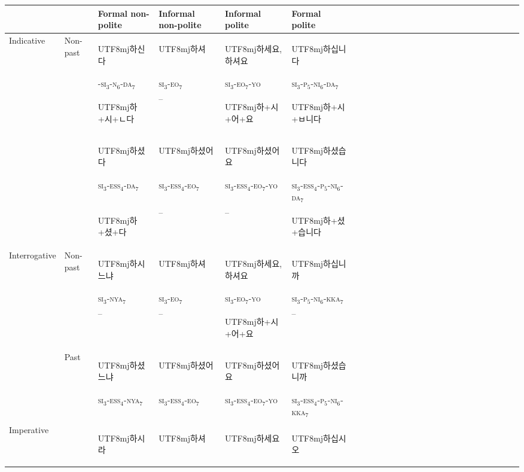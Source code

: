 \documentclass[11pt,letterpaper]{article}
\newcommand{\korean}[1]{\begin{CJK}{UTF8}{mj}#1\end{CJK}}
\begin{document}
\begin{table}[]
    \centering
    \begin{tabular}{llllllllllllllllllllllllll}
           &          &Formal non-polite & Informal non-polite & Informal polite & Formal polite \\ \hline \hline
\multirow{2}{*}{Indicative} & Non-past & \korean{하신다} & \korean{하셔} & \korean{하세요, 하셔요} & \korean{하십니다} \\
                           && -\textsc{si}$_3$-\textsc{n}$_6$-\textsc{da}$_7$ & \textsc{si}$_3$-\textsc{eo}$_7$ & \textsc{si}$_3$-\textsc{eo}$_7$-\textsc{yo} & \textsc{si}$_3$-\textsc{p}$_5$-\textsc{ni}$_6$-\textsc{da}$_7$ \\
&& \korean{하+시+ㄴ다}       &   --   &    \korean{하+시+어+요}             &  \korean{하+시+ㅂ니다}        \\
\hline
&& \korean{하셨다} & \korean{하셨어} & \korean{하셨어요} & \korean{하셨습니다} \\
&& \textsc{si}$_3$-\textsc{ess}$_4$-\textsc{da}$_7$ & \textsc{si}$_3$-\textsc{ess}$_4$-\textsc{eo}$_7$ & \textsc{si}$_3$-\textsc{ess}$_4$-\textsc{eo}$_7$-\textsc{yo} & \textsc{si}$_3$-\textsc{ess}$_4$-\textsc{p}$_5$-\textsc{ni}$_6$-\textsc{da}$_7$ \\
& & \korean{하+셨+다}       &  --    &        --        &  \korean{하+셨+습니다}       \\
\hline
\multirow{2}{*}{Interrogative} & Non-past & \korean{하시느냐} & \korean{하셔} & \korean{하세요, 하셔요} & \korean{하십니까} \\
&& \textsc{si}$_3$-\textsc{nya}$_7$ & \textsc{si}$_3$-\textsc{eo}$_7$ & \textsc{si}$_3$-\textsc{eo}$_7$-\textsc{yo} & \textsc{si}$_3$-\textsc{p}$_5$-\textsc{ni}$_6$-\textsc{kka}$_7$ \\
& &   --     &   --   &   \korean{하+시+어+요}             &  --        \\
\hline
& Past & \korean{하셨느냐} & \korean{하셨어} & \korean{하셨어요} & \korean{하셨습니까} \\
&      & \textsc{si}$_3$-\textsc{ess}$_4$-\textsc{nya}$_7$ & \textsc{si}$_3$-\textsc{ess}$_4$-\textsc{eo}$_7$          & \textsc{si}$_3$-\textsc{ess}$_4$-\textsc{eo}$_7$-\textsc{yo} & \textsc{si}$_3$-\textsc{ess}$_4$-\textsc{p}$_5$-\textsc{ni}$_6$-\textsc{kka}$_7$ \\
& &        &      &                &          \\
\hline
\multirow{2}{*}{Imperative} && \korean{하시라} & \korean{하셔} & \korean{하세요} & \korean{하십시오} \\

\end{tabular}
\end{table}
\end{document}
